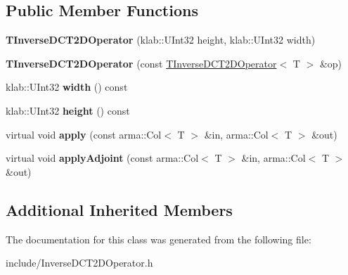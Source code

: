 \subsection*{Public Member Functions}
\begin{DoxyCompactItemize}
\item 
{\bfseries T\+Inverse\+D\+C\+T2\+D\+Operator} (klab\+::\+U\+Int32 height, klab\+::\+U\+Int32 width)\hypertarget{classkl1p_1_1TInverseDCT2DOperator_ac39838e9d518ceb63e306b2e09c2bf04}{}\label{classkl1p_1_1TInverseDCT2DOperator_ac39838e9d518ceb63e306b2e09c2bf04}

\item 
{\bfseries T\+Inverse\+D\+C\+T2\+D\+Operator} (const \hyperlink{classkl1p_1_1TInverseDCT2DOperator}{T\+Inverse\+D\+C\+T2\+D\+Operator}$<$ T $>$ \&op)\hypertarget{classkl1p_1_1TInverseDCT2DOperator_a3a018c10d261c4cc7cef641539cae2b3}{}\label{classkl1p_1_1TInverseDCT2DOperator_a3a018c10d261c4cc7cef641539cae2b3}

\item 
klab\+::\+U\+Int32 {\bfseries width} () const \hypertarget{classkl1p_1_1TInverseDCT2DOperator_a043e67af346e4cf08352ac206359f001}{}\label{classkl1p_1_1TInverseDCT2DOperator_a043e67af346e4cf08352ac206359f001}

\item 
klab\+::\+U\+Int32 {\bfseries height} () const \hypertarget{classkl1p_1_1TInverseDCT2DOperator_adcd32ec5f34b0729233f83409fc4a777}{}\label{classkl1p_1_1TInverseDCT2DOperator_adcd32ec5f34b0729233f83409fc4a777}

\item 
virtual void {\bfseries apply} (const arma\+::\+Col$<$ T $>$ \&in, arma\+::\+Col$<$ T $>$ \&out)\hypertarget{classkl1p_1_1TInverseDCT2DOperator_a4a97e8344c8a510ffe795b8715ab136c}{}\label{classkl1p_1_1TInverseDCT2DOperator_a4a97e8344c8a510ffe795b8715ab136c}

\item 
virtual void {\bfseries apply\+Adjoint} (const arma\+::\+Col$<$ T $>$ \&in, arma\+::\+Col$<$ T $>$ \&out)\hypertarget{classkl1p_1_1TInverseDCT2DOperator_aa06aa031800e430226129c37f2848687}{}\label{classkl1p_1_1TInverseDCT2DOperator_aa06aa031800e430226129c37f2848687}

\end{DoxyCompactItemize}
\subsection*{Additional Inherited Members}


The documentation for this class was generated from the following file\+:\begin{DoxyCompactItemize}
\item 
include/Inverse\+D\+C\+T2\+D\+Operator.\+h\end{DoxyCompactItemize}
